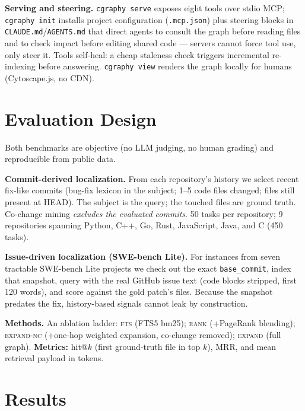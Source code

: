 \documentclass[11pt]{article}
\begin{document}
\textbf{Serving and steering.} \texttt{cgraphy serve} exposes eight tools
over stdio MCP; \texttt{cgraphy init} installs project configuration
(\texttt{.mcp.json}) plus steering blocks in
\texttt{CLAUDE.md}/\texttt{AGENTS.md} that direct agents to consult the
graph before reading files and to check impact before editing shared code
--- servers cannot force tool use, only steer it. Tools self-heal: a cheap
staleness check triggers incremental re-indexing before answering.
\texttt{cgraphy view} renders the graph locally for humans (Cytoscape.js,
no CDN).

\section{Evaluation Design}\label{sec:eval}
Both benchmarks are objective (no LLM judging, no human grading) and
reproducible from public data.

\textbf{Commit-derived localization.} From each repository's history we
select recent fix-like commits (bug-fix lexicon in the subject; 1--5 code
files changed; files still present at HEAD). The subject is the query; the
touched files are ground truth. Co-change mining \emph{excludes the
evaluated commits}. 50 tasks per repository; 9 repositories spanning
Python, C++, Go, Rust, JavaScript, Java, and C (450 tasks).

\textbf{Issue-driven localization (SWE-bench Lite).} For instances from
seven tractable SWE-bench Lite projects we check out the exact
\texttt{base\_commit}, index that snapshot, query with the real GitHub
issue text (code blocks stripped, first 120 words), and score against the
gold patch's files. Because the snapshot predates the fix, history-based
signals cannot leak by construction.

\textbf{Methods.} An ablation ladder: \textsc{fts} (FTS5 bm25);
\textsc{rank} (+PageRank blending); \textsc{expand-nc} (+one-hop weighted
expansion, co-change removed); \textsc{expand} (full graph).
\textbf{Metrics:} hit@$k$ (first ground-truth file in top $k$), MRR, and
mean retrieval payload in tokens.

\section{Results}\label{sec:results}
\end{document}
